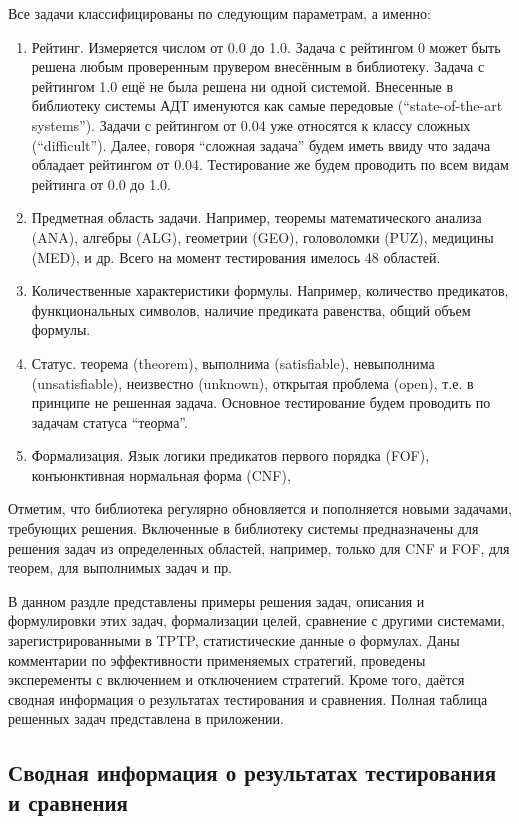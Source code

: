 Все задачи классифицированы по следующим параметрам, а именно:
\begin{enumerate}
\item {Рейтинг.} Измеряется числом от 0.0 до 1.0. Задача с рейтингом 0 может быть решена любым проверенным прувером внесённым в библиотеку. Задача с рейтингом 1.0 ещё не была решена ни одной системой. Внесенные в библиотеку системы АДТ именуются как  самые передовые (``state-of-the-art systems''). Задачи с рейтингом от 0.04 уже относятся к классу сложных (``difficult''). Далее, говоря ``сложная задача'' будем иметь ввиду что задача обладает рейтингом от 0.04. Тестирование же будем проводить по всем видам рейтинга от 0.0 до 1.0.
\item {Предметная область задачи.} Например, теоремы математического анализа (ANA), алгебры (ALG), геометрии (GEO), головоломки (PUZ), медицины (MED), и др. Всего на момент тестирования имелось 48 областей.
\item {Количественные характеристики формулы.} Например, количество предикатов, функциональных символов, наличие предиката равенства, общий объем формулы.
\item {Статус.} теорема (theorem), выполнима (satisfiable), невыполнима (unsatisfiable), неизвестно (unknown), открытая проблема (open), т.е. в принципе не решенная задача. Основное тестирование будем проводить по задачам статуса ``теорма''.
\item {Формализация.} Язык логики предикатов первого порядка (FOF), конъюнктивная нормальная форма (CNF),  
\end{enumerate}

Отметим, что библиотека регулярно обновляется и пополняется новыми задачами, требующих решения. Включенные в библиотеку системы предназначены для решения задач из определенных областей, например, только для CNF и FOF, для теорем, для выполнимых задач и пр. 

В данном раздле представлены примеры решения задач, описания и формулировки этих задач, формализации целей, сравнение с другими системами, зарегистрированными в TPTP, статистические данные о формулах. Даны комментарии по эффективности применяемых стратегий, проведены эксперементы с включением и отключением стратегий. Кроме того, даётся сводная информация о результатах тестирования и сравнения. Полная таблица решенных задач представлена в приложении.



\subsection{Сводная информация о результатах тестирования и сравнения}


